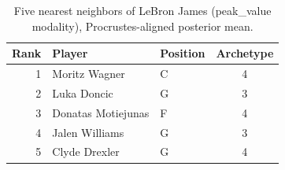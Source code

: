 \begin{table}[htbp]
  \centering\small
  \begin{tabular}{rllc}
    \toprule
    Rank & Player & Position & Archetype \\
    \midrule
    1 & Moritz Wagner & C & 4 \\
    2 & Luka Doncic & G & 3 \\
    3 & Donatas Motiejunas & F & 4 \\
    4 & Jalen Williams & G & 3 \\
    5 & Clyde Drexler & G & 4 \\
    \bottomrule
  \end{tabular}
  \caption{Five nearest neighbors of LeBron James (peak_value modality), Procrustes-aligned posterior mean.}
  \label{tab:LeBron_James_neighbors_peak_value}
\end{table}

